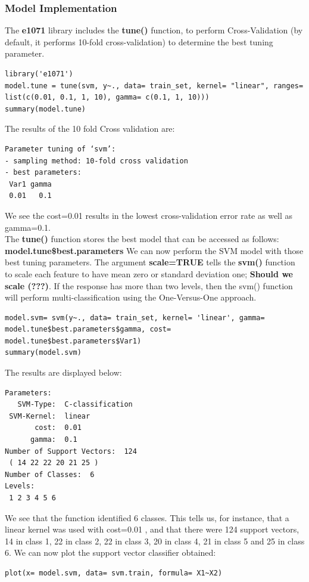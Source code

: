 \documentclass[]{report}
\begin{document}
\subsubsection{Model Implementation}
The \textbf{e1071} library includes the \textbf{tune()} function, to perform Cross-Validation (by default, it performs 10-fold cross-validation) to determine the best tuning parameter.
\begin{lstlisting}
library('e1071')
model.tune = tune(svm, y~., data= train_set, kernel= "linear", ranges= list(c(0.01, 0.1, 1, 10), gamma= c(0.1, 1, 10)))
summary(model.tune)
\end{lstlisting}
The results of the 10 fold Cross validation are:
\begin{verbatim}
Parameter tuning of ‘svm’:
- sampling method: 10-fold cross validation 
- best parameters:
 Var1 gamma
 0.01   0.1
\end{verbatim}
We see the cost=0.01 results in the lowest cross-validation error rate as well as gamma=0.1.\\
The \textbf{tune()} function stores the best model that can be accessed as follows: \textbf{model.tune\$best.parameters} We can now perform the SVM model with those best tuning parameters.
The argument \textbf{scale=TRUE} tells the \textbf{svm()} function to scale each feature to have mean zero or standard deviation one;\textbf{ Should we scale (???)}. If the response has more than two levels, then the svm() function will perform multi-classification using the One-Versus-One approach.
\begin{lstlisting}
model.svm= svm(y~., data= train_set, kernel= 'linear', gamma= model.tune$best.parameters$gamma, cost= model.tune$best.parameters$Var1)
summary(model.svm)
\end{lstlisting}
The results are displayed below:
\begin{verbatim}
Parameters:
   SVM-Type:  C-classification 
 SVM-Kernel:  linear 
       cost:  0.01 
      gamma:  0.1 
Number of Support Vectors:  124
 ( 14 22 22 20 21 25 )
Number of Classes:  6 
Levels: 
 1 2 3 4 5 6
\end{verbatim}
We see that the function identified 6 classes. This tells us, for instance, that a linear kernel was used with cost=0.01 , and that there were 124 support vectors, 14 in class 1, 22 in class 2, 22 in class 3, 20 in class 4, 21 in class 5 and 25 in class 6. 
We can now plot the support vector classifier obtained:
\begin{lstlisting}
plot(x= model.svm, data= svm.train, formula= X1~X2)
\end{lstlisting}
\end{document}
